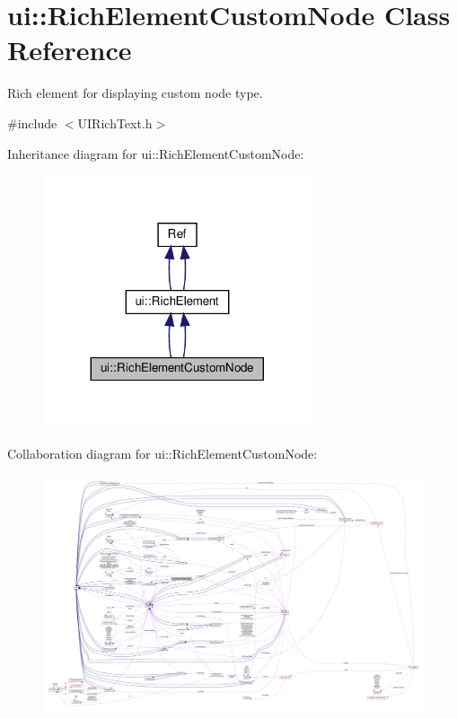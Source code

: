 \hypertarget{classui_1_1RichElementCustomNode}{}\section{ui\+:\+:Rich\+Element\+Custom\+Node Class Reference}
\label{classui_1_1RichElementCustomNode}


Rich element for displaying custom node type.  




{\ttfamily \#include $<$U\+I\+Rich\+Text.\+h$>$}



Inheritance diagram for ui\+:\+:Rich\+Element\+Custom\+Node\+:
\nopagebreak
\begin{figure}[H]
\begin{center}
\leavevmode
\includegraphics[width=224pt]{classui_1_1RichElementCustomNode__inherit__graph}
\end{center}
\end{figure}


Collaboration diagram for ui\+:\+:Rich\+Element\+Custom\+Node\+:
\nopagebreak
\begin{figure}[H]
\begin{center}
\leavevmode
\includegraphics[width=350pt]{classui_1_1RichElementCustomNode__coll__graph}
\end{center}
\end{figure}
